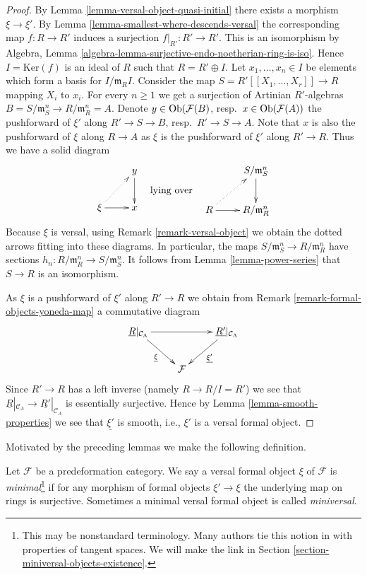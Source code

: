 \begin{proof}
By
Lemma \ref{lemma-versal-object-quasi-initial}
there exists a morphism $\xi \to \xi'$. By
Lemma \ref{lemma-smallest-where-descends-versal}
the corresponding map $f : R \to R'$ induces a surjection
$f|_{R'} : R' \to R'$. This is an isomorphism by
Algebra, Lemma \ref{algebra-lemma-surjective-endo-noetherian-ring-is-iso}.
Hence $I = \text{Ker}(f)$ is an ideal of $R$ such that $R = R' \oplus I$.
Let $x_1, \ldots, x_n \in I$ be elements which form a basis for
$I/\mathfrak m_RI$. Consider the map
$S = R'[[X_1, \ldots, X_r]] \to R$ mapping $X_i$ to $x_i$.
For every $n \geq 1$ we get a surjection of Artinian $R'$-algebras
$B = S/\mathfrak m_S^n \to R/\mathfrak m_R^n = A$. Denote
$y \in \mathop{\rm Ob}\nolimits(\mathcal{F}(B)$, resp.\ $x \in \mathop{\rm Ob}\nolimits(\mathcal{F}(A))$
the pushforward of $\xi'$ along $R' \to S \to B$, resp.\ $R' \to S \to A$.
Note that $x$ is also the pushforward of $\xi$ along $R \to A$ as
$\xi$ is the pushforward of $\xi'$ along $R' \to R$.
Thus we have a solid diagram
$$
\vcenter{
\xymatrix{
& y \ar[d] \\
\xi \ar[r] \ar@{..>}[ru] & x
}
}
\quad\text{lying over}\quad
\vcenter{
\xymatrix{
& S/\mathfrak m_S^n \ar[d] \\
R \ar[r] \ar@{..>}[ru] & R/\mathfrak m_R^n
}
}
$$
Because $\xi$ is versal, using
Remark \ref{remark-versal-object}
we obtain the dotted arrows fitting into these diagrams.
In particular, the maps $S/\mathfrak m_S^n \to R/\mathfrak m_R^n$
have sections $h_n : R/\mathfrak m_R^n \to S/\mathfrak m_S^n$.
It follows from
Lemma \ref{lemma-power-series}
that $S \to R$ is an isomorphism.

\medskip\noindent
As $\xi$ is a pushforward of $\xi'$ along $R' \to R$ we obtain from
Remark \ref{remark-formal-objects-yoneda-map}
a commutative diagram
$$
\xymatrix{
\underline{R}|_{\mathcal{C}_\Lambda} \ar[rr] \ar[rd]_{\underline{\xi}} & &
\underline{R'}|_{\mathcal{C}_\Lambda} \ar[ld]^{\underline{\xi'}} \\
& \mathcal{F}
}
$$
Since $R' \to R$ has a left inverse (namely $R \to R/I = R'$) we see that
$\underline{R}|_{\mathcal{C}_\Lambda} \to
\underline{R'}|_{\mathcal{C}_\Lambda}$ is essentially surjective.
Hence by
Lemma \ref{lemma-smooth-properties}
we see that $\underline{\xi'}$ is smooth, i.e., $\xi'$ is a versal
formal object.
\end{proof}

\noindent
Motivated by the preceding lemmas we make the following definition.

\begin{definition}
\label{definition-minimal-versal}
Let $\mathcal{F}$ be a predeformation category.
We say a versal formal object $\xi$ of $\mathcal{F}$ is
{\it minimal}\footnote{This may be nonstandard terminology. Many
authors tie this notion in with properties of tangent spaces.
We will make the link in
Section \ref{section-miniversal-objects-existence}.}
if for any morphism of formal objects
$\xi' \to \xi$ the underlying map on rings is surjective.
Sometimes a minimal versal formal object is called {\it miniversal}.
\end{definition}

